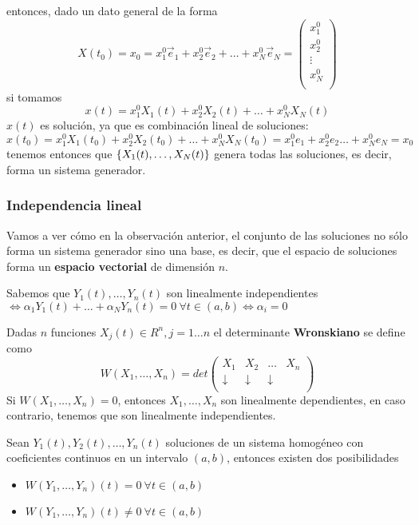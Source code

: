 \noindent entonces, dado un dato general de la forma $$X(t_0) = x_0 = x_1^0\vec{e}_1 + x_2^0\vec{e}_2+\hdots+x_N^0\vec{e}_N = \begin{pmatrix}
x_1^0\\
x_2^0\\
\vdots\\
x_N^0\\
\end{pmatrix}$$
si tomamos $$x(t) = x_1^0X_1(t)+x_2^0X_2(t)+\hdots +x_N^0X_N(t)$$ $x(t)$ es solución, ya que es combinación lineal de soluciones:
$$x(t_0) = x_1^0X_1(t_0)+x_2^0X_2(t_0)+\hdots+x_N^0X_N(t_0) = x_1^0e_1+x_2^0e_2\hdots+x_N^0e_N = x_0$$
tenemos entonces que $\{ X_1(t),\hdots,X_N(t) \}$ genera todas las soluciones, es decir, forma un sistema generador.

\subsubsection{Independencia lineal}
Vamos a ver cómo en la observación anterior, el conjunto de las soluciones no sólo forma un sistema generador sino una base, es decir, que el espacio de soluciones forma un \textbf{espacio vectorial} de dimensión $n$.

Sabemos que 
$Y_1(t), \hdots, Y_n(t) $ son linealmente independientes $ \iff \alpha_1Y_1(t)+\hdots+\alpha_NY_n(t) = 0\ \forall t \in (a, b) \iff \alpha_i = 0$

\begin{definition}
Dadas $n$ funciones $X_j(t) \in R^n, j=1\hdots n$ el determinante \textbf{Wronskiano} se define como
$$W(X_1, \hdots, X_n) = det 
\begin{pmatrix}
X_1 & X_2 & \hdots & X_n\\
\downarrow & \downarrow & \downarrow \\
\end{pmatrix}$$
Si $W(X_1, \hdots, X_n) = 0$, entonces $X_1, \hdots, X_n$ son linealmente dependientes, en caso contrario, tenemos que son linealmente independientes.
\end{definition}

\begin{theorem}
Sean $Y_1(t), Y_2(t), \hdots, Y_n(t)$ soluciones de un sistema homogéneo con coeficientes continuos en un intervalo $(a,b)$, entonces existen dos posibilidades
\begin{itemize}
\item $W(Y_1, \hdots, Y_n)(t) = 0\ \forall t \in (a, b)$
\item $W(Y_1, \hdots, Y_n)(t) \neq 0\ \forall t \in (a, b)$
\end{itemize}
\end{theorem}

